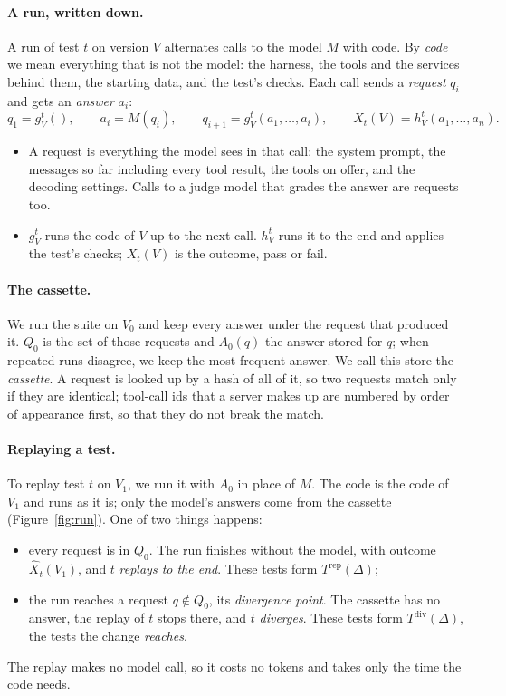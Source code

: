 \documentclass[11pt,a4paper]{article}
\newcommand{\Trep}{T^{\mathrm{rep}}(\Delta)}
\newcommand{\Tdiv}{T^{\mathrm{div}}(\Delta)}
\begin{document}
\paragraph{A run, written down.} A run of test $t$ on version $V$ alternates calls to the model $M$ with code. By
\emph{code} we mean everything that is not the model: the harness, the tools and the services behind them, the
starting data, and the test's checks. Each call sends a \emph{request} $q_i$ and gets an \emph{answer} $a_i$:
\[
  q_1 = g^t_V(), \qquad a_i = M(q_i), \qquad q_{i+1} = g^t_V(a_1, \dots, a_i), \qquad
  X_t(V) = h^t_V(a_1, \dots, a_n).
\]
\begin{itemize}
  \item A request is everything the model sees in that call: the system prompt, the messages so far including
        every tool result, the tools on offer, and the decoding settings. Calls to a judge model that grades the
        answer are requests too.
  \item $g^t_V$ runs the code of $V$ up to the next call. $h^t_V$ runs it to the end and applies the test's checks;
        $X_t(V)$ is the outcome, pass or fail.
\end{itemize}

\paragraph{The cassette.} We run the suite on $V_0$ and keep every answer under the request that produced it.
$Q_0$ is the set of those requests and $A_0(q)$ the answer stored for $q$; when repeated runs disagree, we keep the
most frequent answer. We call this store the \emph{cassette}. A request is looked up by a hash of all of it, so two
requests match only if they are identical; tool-call ids that a server makes up are numbered by order of appearance
first, so that they do not break the match.

\paragraph{Replaying a test.} To replay test $t$ on $V_1$, we run it with $A_0$ in place of $M$. The code is the
code of $V_1$ and runs as it is; only the model's answers come from the cassette (Figure~\ref{fig:run}). One of two
things happens:
\begin{itemize}
  \item every request is in $Q_0$. The run finishes without the model, with outcome $\hat{X}_t(V_1)$, and $t$
        \emph{replays to the end}. These tests form $\Trep$;
  \item the run reaches a request $q \notin Q_0$, its \emph{divergence point}. The cassette has no answer, the
        replay of $t$ stops there, and $t$ \emph{diverges}. These tests form $\Tdiv$, the tests the change
        \emph{reaches}.
\end{itemize}
The replay makes no model call, so it costs no tokens and takes only the time the code needs.
\end{document}
